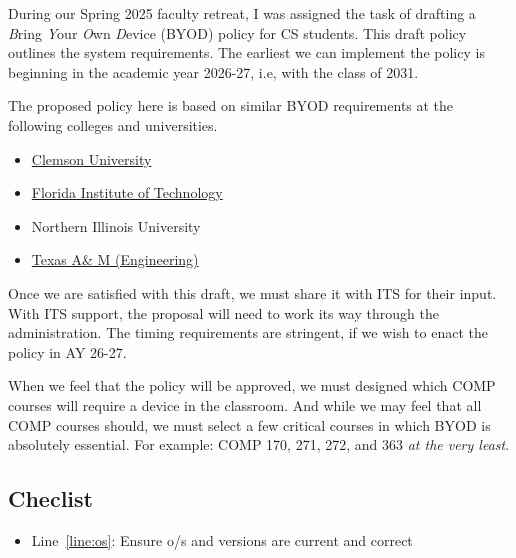 \noindent 
During our Spring 2025 faculty retreat, I was assigned the task of drafting a \emph{B}ring \emph{Y}our \emph{O}wn \emph{D}evice (BYOD) policy for CS students. This draft policy outlines the system requirements. The earliest we can implement the policy is beginning in the academic year 2026-27, i.e, with the class of 2031.

The proposed policy here is based on similar BYOD requirements at the following colleges and universities.

\begin{itemize}
    \item \href{https://clemsonpub.cfmnetwork.com/B.aspx?BookId=11654&PageId=458060}{Clemson University}
    
    \item \href{https://www.fit.edu/policies/information-technology/policies/it-1015-bring-your-own-device-byod-policy/}{Florida Institute of Technology}
    
    \item Northern Illinois University

    \item \href{https://engineering.tamu.edu/academics/byod/index.html}{Texas A\& M (Engineering)}
\end{itemize}

Once we are satisfied with this draft, we must share it with ITS for their input. With ITS support, the proposal will need to work its way through the administration. {\color{purple}The timing requirements are stringent,} if we wish to enact the policy in AY 26-27.

When we feel that the policy will be approved, we must designed which COMP courses will require a device in the classroom. And while we may feel that all COMP courses should, we must select a few critical courses in which BYOD is absolutely essential. For example: COMP 170, 271, 272, and 363 \emph{at the very least}.

\subsection*{Checlist}
\begin{itemize}
    \item Line~\ref{line:os}: Ensure o/s and versions are current and correct
\end{itemize}


\newpage